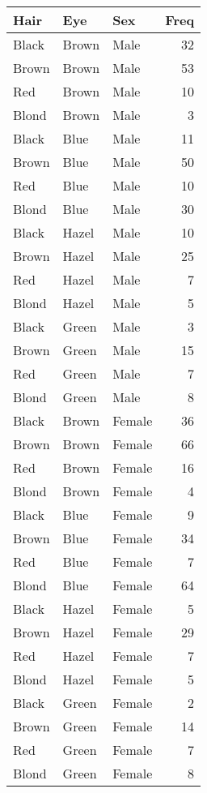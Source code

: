 \documentclass[
]{article}
\begin{document}
\begin{tabular}{l|l|l|r}
\hline
Hair & Eye & Sex & Freq\\
\hline
Black & Brown & Male & 32\\
\hline
Brown & Brown & Male & 53\\
\hline
Red & Brown & Male & 10\\
\hline
Blond & Brown & Male & 3\\
\hline
Black & Blue & Male & 11\\
\hline
Brown & Blue & Male & 50\\
\hline
Red & Blue & Male & 10\\
\hline
Blond & Blue & Male & 30\\
\hline
Black & Hazel & Male & 10\\
\hline
Brown & Hazel & Male & 25\\
\hline
Red & Hazel & Male & 7\\
\hline
Blond & Hazel & Male & 5\\
\hline
Black & Green & Male & 3\\
\hline
Brown & Green & Male & 15\\
\hline
Red & Green & Male & 7\\
\hline
Blond & Green & Male & 8\\
\hline
Black & Brown & Female & 36\\
\hline
Brown & Brown & Female & 66\\
\hline
Red & Brown & Female & 16\\
\hline
Blond & Brown & Female & 4\\
\hline
Black & Blue & Female & 9\\
\hline
Brown & Blue & Female & 34\\
\hline
Red & Blue & Female & 7\\
\hline
Blond & Blue & Female & 64\\
\hline
Black & Hazel & Female & 5\\
\hline
Brown & Hazel & Female & 29\\
\hline
Red & Hazel & Female & 7\\
\hline
Blond & Hazel & Female & 5\\
\hline
Black & Green & Female & 2\\
\hline
Brown & Green & Female & 14\\
\hline
Red & Green & Female & 7\\
\hline
Blond & Green & Female & 8\\
\hline
\end{tabular}
\end{document}
